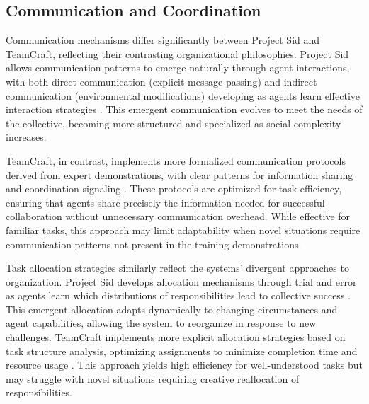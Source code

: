 \documentclass[a4paper, 12pt]{article}
\begin{document}
\subsection{Communication and Coordination}

Communication mechanisms differ significantly between Project Sid and TeamCraft, reflecting their contrasting organizational philosophies. Project Sid allows communication patterns to emerge naturally through agent interactions, with both direct communication (explicit message passing) and indirect communication (environmental modifications) developing as agents learn effective interaction strategies \autocite{al2024projectsidmanyagentsimulations}. This emergent communication evolves to meet the needs of the collective, becoming more structured and specialized as social complexity increases.

TeamCraft, in contrast, implements more formalized communication protocols derived from expert demonstrations, with clear patterns for information sharing and coordination signaling \autocite{long2024teamcraftbenchmarkmultimodalmultiagent,qiu2024collaborativeintelligencepropagatingintentions}. These protocols are optimized for task efficiency, ensuring that agents share precisely the information needed for successful collaboration without unnecessary communication overhead. While effective for familiar tasks, this approach may limit adaptability when novel situations require communication patterns not present in the training demonstrations.

Task allocation strategies similarly reflect the systems' divergent approaches to organization. Project Sid develops allocation mechanisms through trial and error as agents learn which distributions of responsibilities lead to collective success \autocite{al2024projectsidmanyagentsimulations}. This emergent allocation adapts dynamically to changing circumstances and agent capabilities, allowing the system to reorganize in response to new challenges. TeamCraft implements more explicit allocation strategies based on task structure analysis, optimizing assignments to minimize completion time and resource usage \autocite{long2024teamcraftbenchmarkmultimodalmultiagent,dong2024villageragentgraphbasedmultiagentframework}. This approach yields high efficiency for well-understood tasks but may struggle with novel situations requiring creative reallocation of responsibilities.
\end{document}
